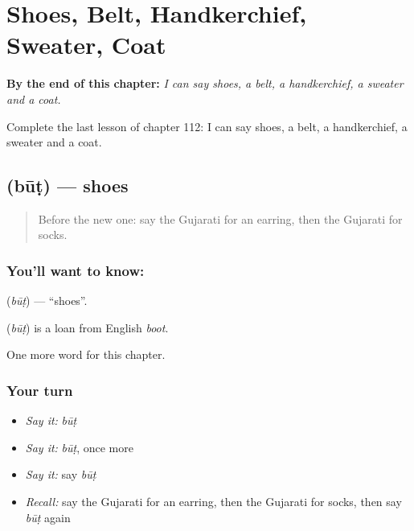 
\chapter{Shoes, Belt, Handkerchief, Sweater, Coat}
\label{ch:gu-shoes-belt-handkerchief-sweater-coat}

\begin{chapteropening}
\textbf{By the end of this chapter:} \emph{I can say shoes, a belt, a handkerchief, a sweater and a coat.}

Complete the last lesson of chapter 112: I can say shoes, a belt, a handkerchief, a sweater and a coat.
\end{chapteropening}

\section[\texorpdfstring{\gu{બૂટ} (būṭ)}{બૂટ (būṭ)}]{ (būṭ) — shoes}

\label{lesson:GU-C112-but}



\begin{quote}
Before the new one: say the Gujarati for an earring, then the Gujarati for socks.
\end{quote}

\subsection*{You'll want to know: }
\textbf{} (\emph{būṭ}) — \textquotedblleft{}shoes\textquotedblright{}.

\begin{cousinweb}
\textbf{} (\emph{būṭ}) is a loan from English \emph{boot}.
\end{cousinweb}

\begin{grammarlens}[title={What you've built}]
One more word for this chapter.
\end{grammarlens}

\subsection*{Your turn}
\begin{itemize}
\raggedright
  \item \emph{Say it:} \emph{būṭ}
  \item \emph{Say it:} \emph{būṭ}, once more
  \item \emph{Say it:} say \emph{būṭ}
  \item \emph{Recall:} say the Gujarati for an earring, then the Gujarati for socks, then say \emph{būṭ} again
\end{itemize}

